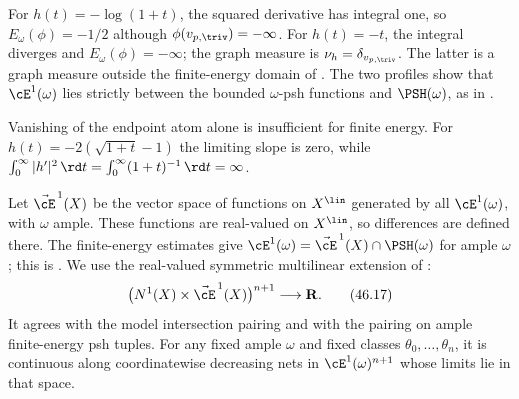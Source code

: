 \begin{example}
For $h(t)=-\log(1+t)$, the squared derivative has integral one, so
$E_\omega(\phi)=-1/2$ although $\phi(v_{p,\triv})=-\infty$.
For $h(t)=-t$, the integral diverges and $E_\omega(\phi)=-\infty$;
the graph measure is $\nu_h=\delta_{v_{p,\triv}}$.
The latter is a graph measure outside the finite-energy domain of
.
The two profiles show that $\cE^1(\omega)$ lies strictly between
the bounded $\omega$-psh functions and $\PSH(\omega)$, as in
.

Vanishing of the endpoint atom alone is insufficient for finite energy.
For $h(t)=-2(\sqrt{1+t}-1)$ the limiting slope is zero, while
$\int_0^\infty|h'|^2\,\rd t=\int_0^\infty(1+t)^{-1}\,\rd t=\infty$.
\end{example}

Let $\vec{\cE}^{\,1}(X)$ be the vector space of functions on
$X^{\lin}$ generated by all $\cE^1(\omega)$, with $\omega$ ample.
These functions are real-valued on $X^{\lin}$, so differences are
defined there.  The finite-energy estimates give
$\cE^1(\omega)=\vec{\cE}^{\,1}(X)\cap\PSH(\omega)$ for ample $\omega$;
this is \cite[Lemma~7.13]{BJ22}.  We use the real-valued symmetric
multilinear extension of \cite[Theorem~7.14]{BJ22}:
\[
 \bigl(N^1(X)\times\vec{\cE}^{\,1}(X)\bigr)^{n+1}
       \longrightarrow\mathbf R.
\tag{46.17}\label{eq:bj-e1-polarized-pairing}
\]
It agrees with the model intersection pairing and with the pairing on
ample finite-energy psh tuples.  For any fixed ample $\omega$ and fixed
classes $\theta_0,\dots,\theta_n$, it is continuous along coordinatewise
decreasing nets in $\cE^1(\omega)^{n+1}$ whose limits lie in that space.

